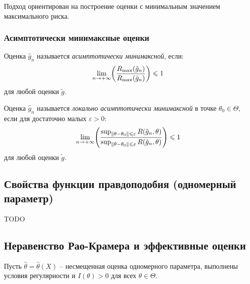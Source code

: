Подход ориентирован на построение оценки с минимальным значением максимального риска.

\subsubsection{Асимптотически минимаксные оценки}
\begin{definition}
	Оценка $\hat{g}_{n}$ называется \textit{асимптотически минимаксной}, если:
	\[
		\lim_{n \to +\infty}\parens*{\frac{R_{\max}(\hat{g}_n)}{R_{\max}(\tilde{g}_n)}} \leqslant 1
	\]
	для любой оценки $\tilde{g}$.
\end{definition}

\begin{definition}
	Оценка $\hat{g}_{n}$ называется \textit{локально асимптотически минимаксной} в точке $\theta_{0} \in \Theta$, если для достаточно малых $\varepsilon > 0$:
	\[
		\lim_{n \to +\infty}\parens*{\frac{\sup_{\|\theta - \theta_0\| \leqslant \varepsilon} R(\hat{g}_n, \theta)}{\sup_{\|\theta - \theta_0\| \leqslant \varepsilon} R(\tilde{g}_n, \theta)}} \leqslant 1
	\]
	для любой оценки $\tilde{g}$.
\end{definition}

\subsection{Свойства функции правдоподобия (одномерный параметр)}
TODO

\subsection{Неравенство Рао-Крамера и эффективные оценки}
Пусть $\hat{\theta} = \hat{\theta}(X)$ -- несмещенная оценка одномерного параметра, выполнены условия регулярности и $I(\theta) > 0$ для всех $\theta \in \Theta$.

